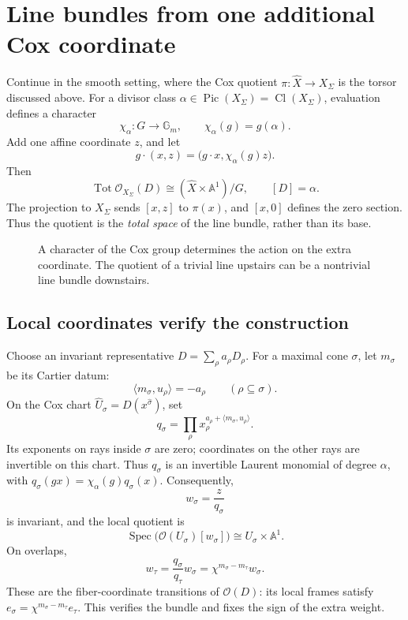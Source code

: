 \documentclass[11pt]{article}
\theoremstyle{definition}
\theoremstyle{remark}
\DeclareMathOperator{\Spec}{Spec}
\DeclareMathOperator{\Cl}{Cl}
\DeclareMathOperator{\Pic}{Pic}
\DeclareMathOperator{\Tot}{Tot}
\newcommand{\A}{\mathbb A}
\newcommand{\Gm}{\mathbb G_m}
\newcommand{\OO}{\mathcal O}
\begin{document}
\section{Line bundles from one additional Cox coordinate}
\label{sec:nov02-associated-line-bundles}

Continue in the smooth setting, where the Cox quotient
\(\pi:\widehat X\to X_\Sigma\) is the torsor discussed above.
For a divisor class \(\alpha\in\Pic(X_\Sigma)=\Cl(X_\Sigma)\),
evaluation defines a character
\[
\chi_\alpha:G\longrightarrow\Gm,\qquad
\chi_\alpha(g)=g(\alpha).
\]
Add one affine coordinate \(z\), and let
\[
g\cdot(x,z)=\bigl(g\cdot x,\chi_\alpha(g)z\bigr).
\]
Then
\[
\boxed{
\Tot\OO_{X_\Sigma}(D)
\cong(\widehat X\times\A^1)/G,
\qquad [D]=\alpha.
}
\]
The projection to \(X_\Sigma\) sends \([x,z]\) to \(\pi(x)\),
and \([x,0]\) defines the zero section. Thus the quotient is the
\emph{total space} of the line bundle, rather than its base.

\begin{figure}[htbp]
\centering
{}
\caption{A character of the Cox group determines the action on the
extra coordinate. The quotient of a trivial line upstairs can be a
nontrivial line bundle downstairs.}
\label{fig:nov02-associated-bundle}
\end{figure}

\subsection{Local coordinates verify the construction}

Choose an invariant representative
\(D=\sum_\rho a_\rho D_\rho\). For a maximal cone \(\sigma\),
let \(m_\sigma\) be its Cartier datum:
\[
\langle m_\sigma,u_\rho\rangle=-a_\rho
\qquad(\rho\subseteq\sigma).
\]
On the Cox chart
\(\widehat U_\sigma=D(x^{\widehat\sigma})\), set
\[
q_\sigma=
\prod_\rho x_\rho^{a_\rho+\langle m_\sigma,u_\rho\rangle}.
\]
Its exponents on rays inside \(\sigma\) are zero; coordinates on
the other rays are invertible on this chart. Thus \(q_\sigma\)
is an invertible Laurent monomial of degree \(\alpha\), with
\(q_\sigma(gx)=\chi_\alpha(g)q_\sigma(x)\). Consequently,
\[
w_\sigma=\frac{z}{q_\sigma}
\]
is invariant, and the local quotient is
\[
\Spec\bigl(\OO(U_\sigma)[w_\sigma]\bigr)
\cong U_\sigma\times\A^1.
\]
On overlaps,
\[
w_\tau=\frac{q_\sigma}{q_\tau}w_\sigma
=\chi^{m_\sigma-m_\tau}w_\sigma.
\]
These are the fiber-coordinate transitions of \(\OO(D)\): its local
frames satisfy \(e_\sigma=\chi^{m_\sigma-m_\tau}e_\tau\).
This verifies the bundle and fixes the sign of the extra weight.
\end{document}
